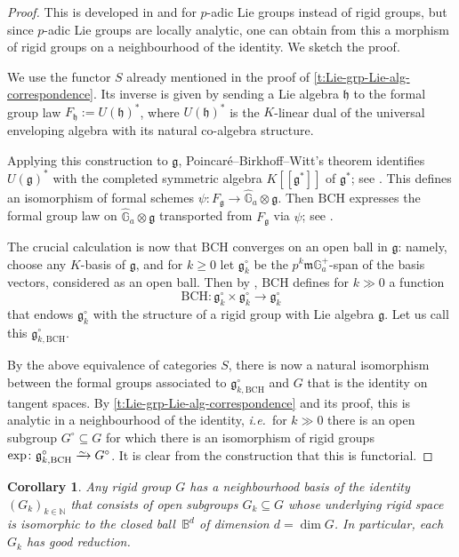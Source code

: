 \documentclass[11pt]{amsart}
\numberwithin{equation}{section}
\newtheorem{Corollary}[thm]{Corollary}
\theoremstyle{definition}
\theoremstyle{remark}
\newcommand{\lra}{\longrightarrow}
\newcommand*{\lowsim}{\vbox to 0pt{\vss\hbox{$\scriptstyle\sim$}\vskip-2pt}}
\newcommand*{\isomarrow}{\xrightarrow{\lowsim}}
\newcommand{\B}{\mathbb{B}}
\newcommand{\G}{\mathbb{G}}
\newcommand{\N}{\mathbb{N}}
\newcommand{\m}{\mathfrak{m}}
\newcommand{\mg}{\mathfrak{g}}
\newcommand{\BCH}{\mathrm{BCH}}
\begin{document}
\begin{proof}
	This is developed in \cite[Chapitre~II]{Bourbaki-Lie} and \cite[Corollary~III.18.19]{Schneider_Lie} for $p$-adic Lie groups instead of rigid groups, but since $p$-adic Lie groups are locally analytic, one can obtain from this a morphism of rigid groups on a neighbourhood of the identity.	
	We sketch the proof.  
	
	We use the functor $S$ already mentioned in the proof of \cref{t:Lie-grp-Lie-alg-correspondence}.
	Its inverse is given by sending a Lie algebra $\mathfrak h$ to the formal group law $F_{\mathfrak h}:=U(\mathfrak h)^{\ast}$, where $U(\mathfrak h)^{\ast}$ is the $K$-linear dual of the universal enveloping algebra with its natural co-algebra structure.
	
	Applying this construction to $\mathfrak g$,  Poincar\'e--Birkhoff--Witt's theorem  identifies $U(\mathfrak g)^{\ast}$ with the completed symmetric algebra $K[[\mathfrak g^{\ast}]]$ of $\mg^\ast$; see \cite[Proposition~18.3]{Schneider_Lie}. This defines an isomorphism of formal schemes $\psi\colon F_{\mg}\to \widehat{\G}_a\otimes \mg$. Then $\mathrm{BCH}$ expresses the formal group law on $\widehat{\G}_a\otimes \mg$ transported from  $F_{\mg}$ via $\psi$; see \cite[Corollary~18.15]{Schneider_Lie}.
	
	The crucial calculation is now that $\mathrm{BCH}$ converges on an open ball in $\mg$: namely, choose any $K$-basis of $\mathfrak g$, and for $k\geq 0$ let $\mg^\circ_{k}$ be the $p^{k}\m\G_a^+$-span of the basis vectors, considered as an open ball. Then by \cite[Proposition~17.6]{Schneider_Lie}, $\mathrm{BCH}$ defines for $k\gg 0$ a function
	\[\mathrm{BCH}\colon\mg^\circ_{k}\times \mg^\circ_{k}\lra \mg^\circ_{k}\]
	that endows $\mg^\circ_{k}$ with the structure of a rigid group  with Lie algebra $\mathfrak g$. Let us call this $\mg^\circ_{k,\BCH}$.
	
	By the above equivalence of categories $S$, there is now a natural isomorphism between the formal groups associated to  $\mg^\circ_{k,\BCH}$ and $G$ that is the identity on tangent spaces. By \cref{t:Lie-grp-Lie-alg-correspondence} and its proof, this is analytic in a neighbourhood of the identity, \textit{i.e.}~for $k\gg 0$ there is an open subgroup $G^\circ\subseteq G$ for which there is an isomorphism of rigid groups $\exp\colon \mg^\circ_{k,\BCH}\isomarrow G^\circ$. It is clear from the construction that this is functorial.
\end{proof}

\begin{Corollary}\label{c:neighbourhood-basis-good-reduction}
	Any rigid group $G$ has a neighbourhood basis  of the identity  $(G_k)_{k\in\N}$ that consists of open subgroups $G_k\subseteq G$ whose underlying rigid space is isomorphic to the closed ball\, $\B^d$ of dimension $d=\dim G$. In particular, each $G_k$ has good reduction.
\end{Corollary}
\end{document}
